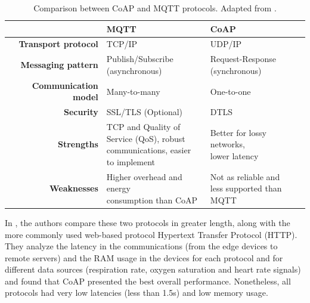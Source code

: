 \renewcommand{\arraystretch}{1.5}
\begin{table}[H]
    \centering
    \caption[Comparison between \acs{CoAP} and \acs{MQTT} protocols.]{Comparison between \acs{CoAP} and \acs{MQTT} protocols. Adapted from \cite{10.5555/3161403}.}
    \begin{adjustbox}{width=0.9\columnwidth,center}
    \begin{tabular}{r|l|l}
        & \textbf{\acs{MQTT}}& \textbf{\acs{CoAP}}  \\ \hline
        \textbf{Transport protocol} & TCP/IP & UDP/IP \\
        \textbf{Messaging pattern} & \makecell{Publish/Subscribe \\ (asynchronous)} & \makecell{Request-Response \\ (synchronous)} \\
        \textbf{Communication model} & Many-to-many & One-to-one \\
        \textbf{Security} & SSL/TLS (Optional) & DTLS \\
        \textbf{Strengths} & \makecell{TCP and Quality of \\ Service (QoS), robust \\communications, easier \\ to implement } & \makecell{Better for lossy networks,\\ lower latency} \\
        \textbf{Weaknesses} & \makecell{Higher overhead and energy\\ consumption than \acs{CoAP}} & \makecell{Not as reliable and \\less supported than MQTT} \\
    \end{tabular}
    \end{adjustbox}
    \label{tab:comparsion-applicationprotocols}
\end{table} 
\renewcommand{\arraystretch}{1}


In \cite{Rubi2019}, the authors compare these two protocols in greater length, along with the more commonly used web-based protocol Hypertext Transfer Protocol (HTTP). They analyze the latency in the communications (from the edge devices to remote servers) and the RAM usage in the devices for each protocol and for different data sources (respiration rate, oxygen saturation and heart rate signals) and found that \acs{CoAP} presented the best overall performance. Nonetheless, all protocols had very low latencies (less than 1.5s) and low memory usage.

